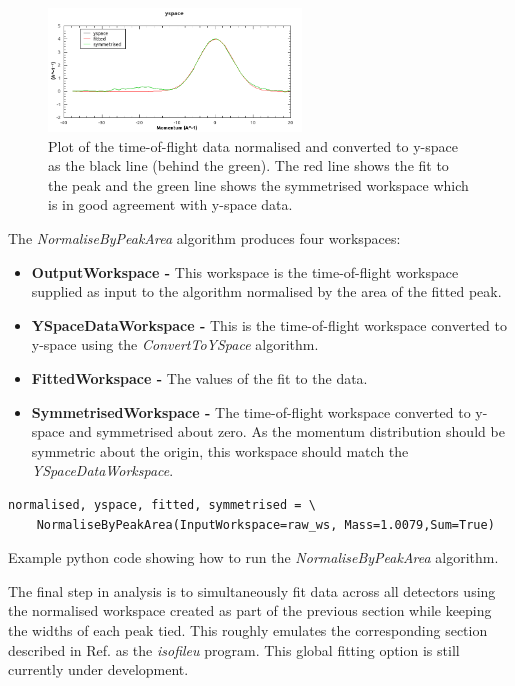 \documentclass[paper=a4, fontsize=11pt]{scrartcl}	%
\numberwithin{equation}{section}															%
\numberwithin{figure}{section}																%
\numberwithin{table}{section}
\begin{document}
\begin{figure}[H]
\centering
\includegraphics[width=0.6\textwidth]{img/yspace-norm.png}
\caption{Plot of the time-of-flight data normalised and converted to y-space as the black line (behind the green). The red line shows the fit to the peak and the green line shows the symmetrised workspace which is in good agreement with y-space data.}
\label{fig:yspace-norm}
\end{figure}

The \textit{NormaliseByPeakArea} algorithm produces four workspaces:

\begin{itemize}
\item \textbf{OutputWorkspace - } This workspace is the time-of-flight workspace supplied as input to the algorithm normalised by the area of the fitted peak.
\item \textbf{YSpaceDataWorkspace - } This is the time-of-flight workspace converted to y-space using the \textit{ConvertToYSpace} algorithm.
\item \textbf{FittedWorkspace - } The values of the fit to the data.
\item \textbf{SymmetrisedWorkspace - } The time-of-flight workspace converted to y-space and symmetrised about zero. As the momentum distribution should be symmetric about the origin, this workspace should match the \textit{YSpaceDataWorkspace}.
\end{itemize}

\begin{listing}[H]
\begin{verbatim}
normalised, yspace, fitted, symmetrised = \
	NormaliseByPeakArea(InputWorkspace=raw_ws, Mass=1.0079,Sum=True)
\end{verbatim}
\caption{Example python code showing how to run the \textit{NormaliseByPeakArea} algorithm.}
\label{lst:normalise-peak-area}
\end{listing}

The final step in analysis is to simultaneously fit data across all detectors using the normalised workspace created as part of the previous section while keeping the widths of each peak tied. This roughly emulates the corresponding section described in Ref. \cite{mayers2010user} as the \textit{isofileu} program. This global fitting option is still currently under development.
\end{document}
